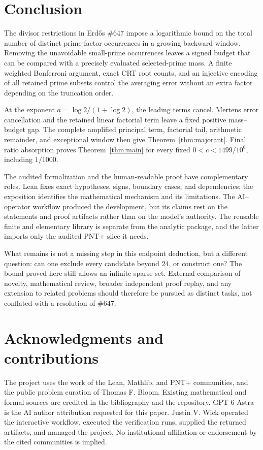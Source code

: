 \documentclass[11pt,a4paper]{article}
\theoremstyle{definition}
\theoremstyle{remark}
\numberwithin{equation}{section}
\begin{document}
\section{Conclusion}\label{sec:conclusion}
The divisor restrictions in Erd\H{o}s \#647 impose a logarithmic bound on the
total number of distinct prime-factor occurrences in a growing backward
window. Removing the unavoidable small-prime occurrences leaves a signed
budget that can be compared with a precisely evaluated selected-prime mass.
A finite weighted Bonferroni argument, exact CRT root counts, and an injective
encoding of all retained prime subsets control the averaging error without an
extra factor depending on the truncation order.

At the exponent $a=\log2/(1+\log2)$, the leading terms cancel. Mertens error
cancellation and the retained linear factorial term leave a fixed positive
mass--budget gap. The complete amplified principal term, factorial tail,
arithmetic remainder, and exceptional window then give
Theorem~\ref{thm:majorant}. Final ratio absorption proves
Theorem~\ref{thm:main} for every fixed $0<c<1499/10^6$, including $1/1000$.

The audited formalization and the human-readable proof have complementary
roles. Lean fixes exact hypotheses, signs, boundary cases, and dependencies;
the exposition identifies the mathematical mechanism and its limitations.
The AI--operator workflow produced the development, but its claims rest on
the statements and proof artifacts rather than on the model's authority.
The reusable finite and elementary library is separate from the analytic
package, and the latter imports only the audited PNT+ slice it needs.

What remains is not a missing step in this endpoint deduction, but a different
question: can one exclude every candidate beyond $24$, or construct one?
The bound proved here still allows an infinite sparse set. External comparison
of novelty, mathematical review, broader independent proof replay, and any
extension to related problems should therefore be pursued as distinct tasks,
not conflated with a resolution of \#647.

\section*{Acknowledgments and contributions}
The project uses the work of the Lean, Mathlib, and PNT+ communities, and the
public problem curation of Thomas F. Bloom. Existing mathematical and formal
sources are credited in the bibliography and the repository. GPT 6 Astra is
the AI author attribution requested for this paper. Justin V. Wick operated
the interactive workflow, executed the verification runs, supplied the returned
artifacts, and managed the project. No institutional affiliation or endorsement
by the cited communities is implied.
\end{document}
